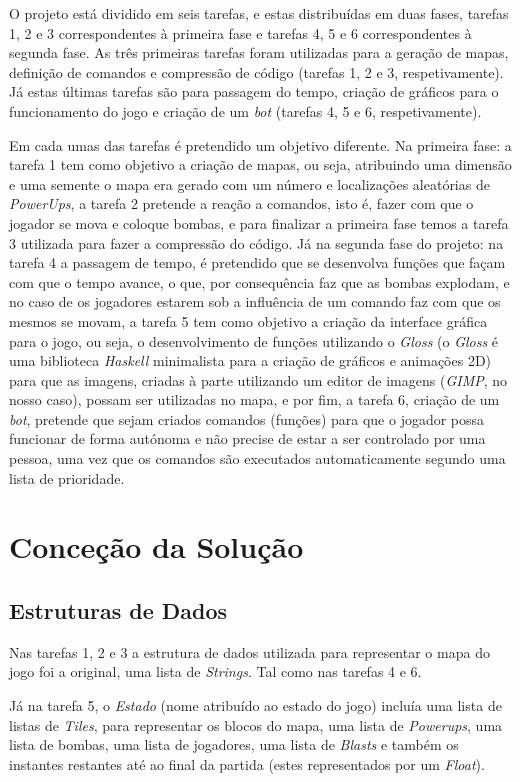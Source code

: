 \documentclass[a4paper]{report}
\begin{document}
O projeto está dividido em seis tarefas, e estas distribuídas em duas fases, tarefas 1, 2 e 3 correspondentes à primeira fase e tarefas 4, 5 e 6 correspondentes à segunda fase. As três primeiras tarefas foram utilizadas para a geração de mapas, definição de comandos e compressão de código (tarefas 1, 2 e 3, respetivamente). Já estas últimas tarefas são para passagem do tempo, criação de gráficos para o funcionamento do jogo e criação de um \textit{bot} (tarefas 4, 5 e 6, respetivamente).

Em cada umas das tarefas é pretendido um objetivo diferente. Na primeira fase: a tarefa 1 tem como objetivo a criação de mapas, ou seja, atribuindo uma dimensão e uma semente o mapa era gerado com um número e localizações aleatórias de \textit{PowerUps}, a tarefa 2 pretende a reação a comandos, isto é, fazer com que o jogador se mova e coloque bombas, e para finalizar a primeira fase temos a tarefa 3 utilizada para fazer a compressão do código. Já na segunda fase do projeto: na tarefa 4 a passagem de tempo, é pretendido que se desenvolva funções que façam com que o tempo avance, o que, por consequência faz que as bombas explodam, e no caso de os jogadores estarem sob a influência de um comando faz com que os mesmos se movam, a tarefa 5 tem como objetivo a criação da interface gráfica para o jogo, ou seja, o desenvolvimento de funções utilizando o \textit{Gloss} (o \textit{Gloss} é uma biblioteca \textit{Haskell} minimalista para a criação de gráficos e animações 2D) para que as imagens, criadas à parte utilizando um editor de imagens (\textit{GIMP}, no nosso caso), possam ser utilizadas no mapa, e por fim, a tarefa 6, criação de um \textit{bot}, pretende que sejam criados comandos (funções) para que o jogador possa funcionar de forma autónoma e não precise de estar a ser controlado por uma pessoa, uma vez que os comandos são executados automaticamente segundo uma lista de prioridade.
\chapter{Conceção da Solução}
\label{sec:solucao}
\section{Estruturas de Dados}
Nas tarefas 1, 2 e 3 a estrutura de dados utilizada para representar o mapa do jogo foi a original, uma lista de \textit{Strings}. Tal como nas tarefas 4 e 6.


Já na tarefa 5, o \textit{Estado} (nome atribuído ao estado do jogo) incluía uma lista de listas de \textit{Tiles}, para representar os blocos do mapa, uma lista de \textit{Powerups}, uma lista de bombas, uma lista de jogadores, uma lista de \textit{Blasts} e também os instantes restantes até ao final da partida (estes representados por um \textit{Float}).
\end{document}
